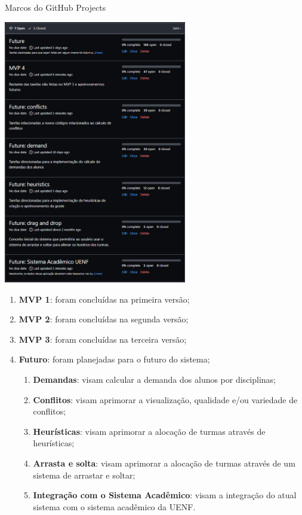 \begin{MyCenteredFigure}
  \caption{Marcos do GitHub Projects}
  \label{fig:ProjectsMilestones}
  \includegraphics[width=0.6\textwidth]{files/img/2.02!5-desenvolvimento/2.02!5.1.4-sistema/GitHubProjects-Open_Milestones}
\end{MyCenteredFigure}

\begin{enumerate}
  \item \textbf{MVP 1}: foram concluídas na primeira versão;
  \item \textbf{MVP 2}: foram concluídas na segunda versão;
  \item \textbf{MVP 3}: foram concluídas na terceira versão;
  \item \textbf{Futuro}: foram planejadas para o futuro do sistema;
        \begin{enumerate}
          \item \textbf{Demandas}: visam calcular a demanda dos alunos por disciplinas;
          \item \textbf{Conflitos}: visam aprimorar a visualização, qualidade e/ou variedade de conflitos;
          \item \textbf{Heurísticas}: visam aprimorar a alocação de turmas através de heurísticas;
          \item \textbf{Arrasta e solta}: visam aprimorar a alocação de turmas através de um sistema de arrastar e soltar;
          \item \textbf{Integração com o Sistema Acadêmico}: visam a integração do atual sistema com o sistema acadêmico da UENF.
        \end{enumerate}
\end{enumerate}

